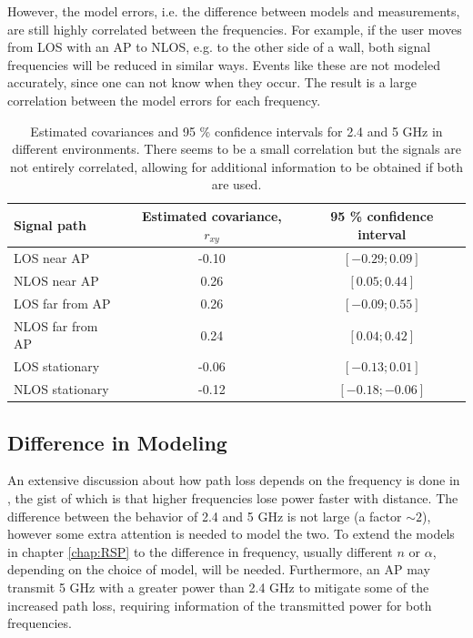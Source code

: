 \documentclass{LTHthesis}
\begin{document}
However, the model errors, i.e. the difference between models and measurements, are still highly correlated between the frequencies. For example, if the user moves from LOS with an AP to NLOS, e.g. to the other side of a wall, both signal frequencies will be reduced in similar ways. Events like these are not modeled accurately, since one can not know when they occur. The result is a large correlation between the model errors for each frequency.
%
\begin{table}
\begin{center}
\begin{tabular}{|l|c|c|}
\hline
Signal path & Estimated covariance, $r_{xy}$ & 95 \% confidence interval \\
\hline
\hline
LOS near AP& -0.10 & $[-0.29;0.09]$ \\
\hline
NLOS near AP& 0.26 & $[0.05;0.44]$  \\
\hline
LOS far from AP& 0.26 & $[-0.09;0.55]$\\
\hline
NLOS far from AP& 0.24& $[0.04; 0.42]$ \\
\hline
LOS stationary  &-0.06 & $[-0.13;0.01]$ \\
\hline
NLOS stationary  & -0.12 &$[-0.18;-0.06]$ \\
\hline
\end{tabular}
\end{center}
\caption{Estimated covariances and 95 \% confidence intervals for 2.4 and 5 GHz in different environments. There seems to be a small correlation but the signals are not entirely correlated, allowing for additional information to be obtained if both are used.}\label{corr_conf}
\end{table}
%
\subsection{Difference in Modeling}
%
An extensive discussion about how path loss depends on the frequency is done in \cite{rappaport96}, the gist of which is that higher frequencies lose power faster with distance. The difference between the behavior of 2.4 and 5 GHz is not large (a factor $\sim 2$), however some extra attention is needed to model the two. To extend the models in chapter \ref{chap:RSP} to the difference in frequency, usually different $n$ or $\alpha$, depending on the choice of model, will be needed. Furthermore, an AP may transmit 5 GHz with a greater power than 2.4 GHz to mitigate some of the increased path loss, requiring information of the transmitted power for both frequencies.  
%
\end{document}

